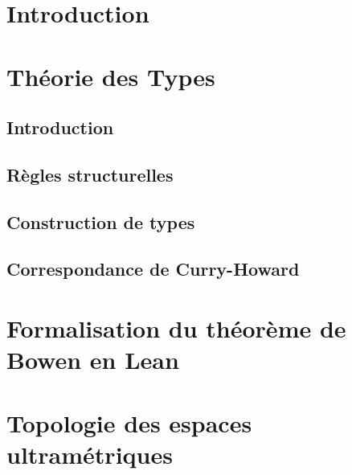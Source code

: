 \documentclass[a4paper, 11pt, twoside]{article}
\title{\Title}
\author{\Author}
\date{\today}
\begin{document}
  \maketitle
  \newpage
  \tableofcontents
  \newpage


  \section*{Introduction}
    
    \newpage

  \section{Théorie des Types}
    \subsection{Introduction}
      

    \subsection{Règles structurelles}
      

    \subsection{Construction de types}
      

    \subsection{Correspondance de Curry-Howard}
      

  \newpage
  \section{Formalisation du théorème de Bowen en Lean}
    

  \newpage
  \section{Topologie des espaces ultramétriques}
    

  \newpage
  \nocite{*}
  \thispagestyle{plain}
  \printbibliography[heading=bibintoc, title={Bibliographie}]

\end{document}
